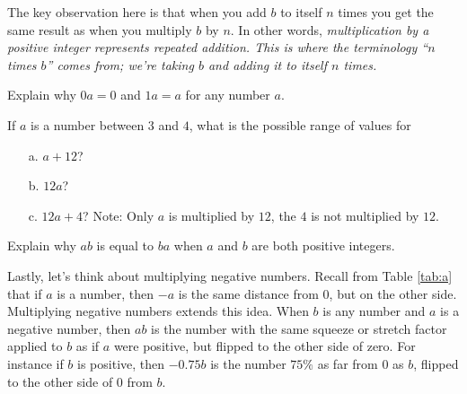 The key observation here is that  when you add $b$ to itself $n$ times you get the same result as when you multiply $b$ by $n$. In other words, \itshape multiplication by a positive integer represents repeated addition. \upshape This is where the terminology ``$n$ times $b$'' comes from; we're taking $b$ and adding it to itself $n$ times.

\par

\begin{question} Explain why $0a = 0$ and $1a=a$ for any number $a$.
\end{question}

\par

\begin{question} If $a$ is a number between $3$ and $4$, what is the possible range of values for
\begin{enumerate}
\item[a.] $a+12$?
\item[b.] $12a$?
\item[c.] $12a+4$? Note: Only $a$ is multiplied by $12$, the $4$ is not multiplied by $12$.
\end{enumerate}
\end{question}

\par  

\begin{question} Explain why $ab$ is equal to $ba$ when $a$ and $b$ are both positive integers.
\end{question}

\par

Lastly, let’s think about multiplying negative numbers.   Recall from Table \ref{tab:a}  that if $a$ is a number, then $-a$ is the same distance from $0$, but on the other side. Multiplying negative numbers extends this idea. When $b$ is any number and $a$ is a negative number, then $ab$ is the number with the same squeeze or stretch factor applied to $b$ as if $a$ were positive, but flipped to the other side of zero. For instance if $b$ is positive, then $-0.75b$ is the number $75\%$ as far from $0$ as $b$, flipped to the other side of $0$ from $b$.

